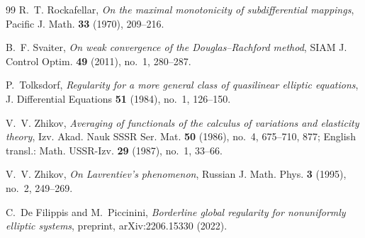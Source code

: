 \documentclass[11pt]{amsart}
\theoremstyle{definition}
\theoremstyle{remark}
\numberwithin{equation}{section}
\begin{document}
\begin{thebibliography}{99}
R.~T. Rockafellar, \emph{On the maximal monotonicity of subdifferential mappings}, Pacific J. Math. \textbf{33} (1970), 209--216.

B.~F. Svaiter, \emph{On weak convergence of the Douglas--Rachford method}, SIAM J. Control Optim. \textbf{49} (2011), no.~1, 280--287.

P.~Tolksdorf, \emph{Regularity for a more general class of quasilinear elliptic equations}, J. Differential Equations \textbf{51} (1984), no.~1, 126--150.

V.~V. Zhikov, \emph{Averaging of functionals of the calculus of variations and elasticity theory}, Izv. Akad. Nauk SSSR Ser. Mat. \textbf{50} (1986), no.~4, 675--710, 877; English transl.: Math. USSR-Izv. \textbf{29} (1987), no.~1, 33--66.

V.~V. Zhikov, \emph{On Lavrentiev's phenomenon}, Russian J. Math. Phys. \textbf{3} (1995), no.~2, 249--269.

C.~De Filippis and M.~Piccinini, \emph{Borderline global regularity for nonuniformly elliptic systems}, preprint, arXiv:2206.15330 (2022).

\end{thebibliography}
\end{document}
